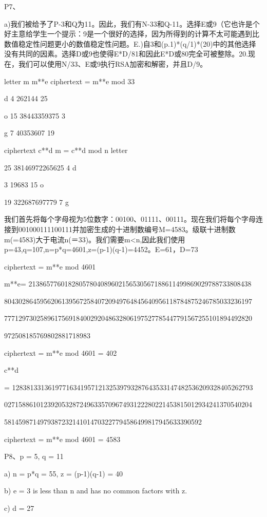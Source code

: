 \documentclass[11pt,UTF8,twoside]{article}
\begin{document}
{		P7、
		
		a)我们被给予了P-3和Q为11。因此，我们有N-33和Q-11。选择E或9（它也许是个好主意给学生一个提示：9是一个很好的选择，因为所得到的计算不太可能遇到比数值稳定性问题更小的数值稳定性问题。E.)自3和(p.1)*(q/1)*(20)中的其他选择没有共同的因素。选择D或9也使得E*D/81和因此E*D或80完全可被整除。20.现在，我们可以使用N/33、E或9执行RSA加密和解密，并且D/9。
		
		letter m m**e ciphertext = m**e mod 33 

		d 4 262144 25 

		o 15 38443359375 3 

		g 7 40353607 19 

		ciphertext c**d m = c**d mod n letter 

		25 38146972265625 4 d 

		3 19683 15 o 

		19 322687697779 7 g 

		
		我们首先将每个字母视为5位数字：00100、01111、00111。现在我们将每个字母连接到001000111100111并加密生成的十进制数编号M=4583。级联十进制数m(=4583)大于电流n(＝33)。我们需要m<n,因此我们使用p=43,q=107,n=p*q=4601,z=(p-1)(q-1)=4452。E=61，D=73
		
		ciphertext = m**e mod 4601 

		m**e= 21386577601828057804089602156530567188611499869029788733808438

		804302864595620613956725840720949764845640956118784875246785033236197

		777129730258961756918400292048632806197527785447791567255101894492820

		972508185769802881718983 

		ciphertext = m**e mod 4601 = 402 

		c**d 

		= 1283813313619771634195712132539793287643533147482536209328405262793

		027158861012392053287249633570967493122280221453815012934241370540204

		5814598714979387232141014703227794586499817945633390592 

		ciphertext = m**e mod 4601 = 4583 

		
		
		P8、p = 5, q = 11 

		a) n = p*q = 55, z = (p-1)(q-1) = 40 

		b) e = 3 is less than n and has no common factors with z. 

		c) d = 27 

}
\end{document}
